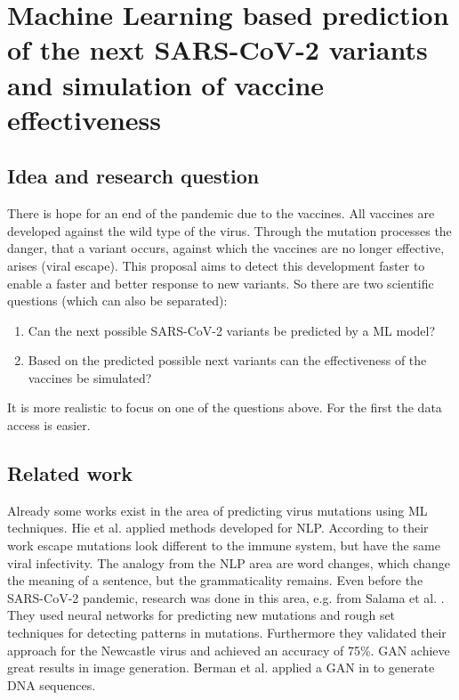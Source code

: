 \section{Machine Learning based prediction of the next SARS-CoV-2 variants and simulation of vaccine effectiveness} \label{proposal1}

\subsection{Idea and research question}

There is hope for an end of the pandemic due to the vaccines. All vaccines are developed against the wild type of the virus. Through the mutation processes the danger, that a variant occurs, against which the vaccines  are no longer effective, arises (viral escape). This proposal aims to detect this development faster to enable a faster and better response to new variants. So there are two scientific questions (which can also be separated):

\begin{enumerate}
	\item Can the next possible SARS-CoV-2 variants be predicted by a \ac{ML} model?
	\item Based on the  predicted possible next variants can the effectiveness of the vaccines be simulated?
\end{enumerate}

\color{green}
It is more realistic to focus on one of the questions above. For the first the data access is easier.
\color{black}

\subsection{Related work}

Already some works exist in the area of predicting virus mutations using \ac{ML} techniques. Hie et al. \cite{Hie2021} applied methods developed for \ac{NLP}.  According to their work escape mutations look different to the immune system, but have the same viral infectivity. The analogy from the \ac{NLP} area are word changes, which change the meaning of a sentence, but the grammaticality remains. %
Even before the SARS-CoV-2 pandemic, research was done in this area, e.g. from Salama et al. \cite{Salama2016}. They used neural networks for predicting new mutations and rough set techniques for detecting patterns in mutations. Furthermore they validated their approach for the Newcastle virus and achieved an accuracy of 75\%. \ac{GAN} achieve great results in image generation. Berman et al. applied a \ac{GAN} in \cite{Berman2020} to generate \ac{DNA} sequences.

